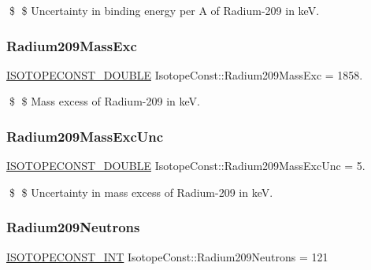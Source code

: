 \$ \$ Uncertainty in binding energy per A of Radium-\/209 in keV. \mbox{\label{group___isotope_const-_radium-_ra209_ga9c6213c59b7b148bc9728a6b321eedc1}} 
\subsubsection{\texorpdfstring{Radium209\+Mass\+Exc}{Radium209MassExc}}
{\footnotesize\ttfamily \mbox{\hyperlink{group___isotope_const-_macros_ga8f45a7272ce02c0b4c65c44636ed719a}{I\+S\+O\+T\+O\+P\+E\+C\+O\+N\+S\+T\+\_\+\+D\+O\+U\+B\+LE}} Isotope\+Const\+::\+Radium209\+Mass\+Exc = 1858.}

\$ \$ Mass excess of Radium-\/209 in keV. \mbox{\label{group___isotope_const-_radium-_ra209_ga7617f104a193afb67c4a3562b0ab694a}} 
\subsubsection{\texorpdfstring{Radium209\+Mass\+Exc\+Unc}{Radium209MassExcUnc}}
{\footnotesize\ttfamily \mbox{\hyperlink{group___isotope_const-_macros_ga8f45a7272ce02c0b4c65c44636ed719a}{I\+S\+O\+T\+O\+P\+E\+C\+O\+N\+S\+T\+\_\+\+D\+O\+U\+B\+LE}} Isotope\+Const\+::\+Radium209\+Mass\+Exc\+Unc = 5.}

\$ \$ Uncertainty in mass excess of Radium-\/209 in keV. \mbox{\label{group___isotope_const-_radium-_ra209_ga3bfa71f26df645065c2b1e829fc6ce47}} 
\subsubsection{\texorpdfstring{Radium209\+Neutrons}{Radium209Neutrons}}
{\footnotesize\ttfamily \mbox{\hyperlink{group___isotope_const-_macros_ga5f18360b3e99483a35c32d789e62621c}{I\+S\+O\+T\+O\+P\+E\+C\+O\+N\+S\+T\+\_\+\+I\+NT}} Isotope\+Const\+::\+Radium209\+Neutrons = 121}

